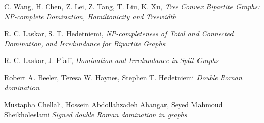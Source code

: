 \begin{thebibliography}{1}
C. Wang, H. Chen, Z. Lei, Z. Tang, T. Liu, K. Xu, \textit{Tree Convex Bipartite Graphs: NP-complete Domination, Hamiltonicity and Treewidth}

R. C. Laskar, S. T. Hedetniemi, \textit{NP-completeness of Total and Connected Domination, and Irredundance for Bipartite Graphs}

R. C. Laskar, J. Pfaff, \textit{Domination and Irredundance in Split Graphs}

Robert A. Beeler, Teresa W. Haynes, Stephen T. Hedetniemi \textit{Double Roman domination}

Mustapha Chellali, Hossein Abdollahzadeh Ahangar, Seyed Mahmoud Sheikholeslami  \textit{Signed double Roman domination in graphs}


\end{thebibliography}